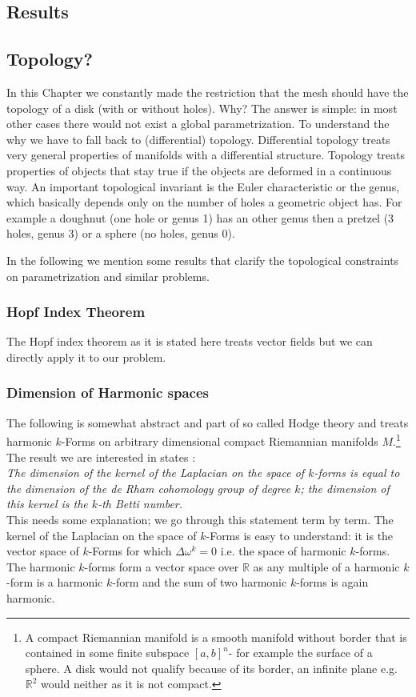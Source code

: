 \subsection{Results}

\subsection{Topology?}
In this Chapter we constantly made the restriction that the mesh should have the topology of a disk (with or without holes). Why? The answer is simple: in most other cases there would not exist a global parametrization. To understand the why we have to fall back to (differential) topology. Differential topology treats very general properties of manifolds with a differential structure. Topology treats properties of objects that stay true if the objects are deformed in a continuous way. An important topological invariant is the Euler characteristic or the genus, which basically depends only on the number of holes a geometric object has. For example a doughnut (one hole or genus 1) has an other genus then a pretzel (3 holes, genus 3) or a sphere (no holes, genus 0).

In the following we mention some results that clarify the topological constraints on parametrization and similar problems.

\subsubsection{Hopf Index Theorem}
The Hopf index theorem  as it is stated here treats vector fields but we can directly apply it to our problem.

\subsubsection{Dimension of Harmonic spaces }
The following is somewhat abstract and part of so called Hodge theory and treats harmonic $k$-Forms on arbitrary dimensional compact Riemannian manifolds $M$.\footnote{ A compact Riemannian manifold is a smooth manifold without border that is contained in some finite subspace $[a,b]^n$- for example the surface of a sphere. A disk would not qualify because of its border, an infinite plane e.g. $\mathbb R^2$ would neither as it is not compact.} The result we are interested in states : 
\[\]
\emph{The dimension of the kernel of the Laplacian on the space of $k$-forms is equal to the dimension of the de Rham cohomology group of degree $k$; the dimension of this kernel is the $k$-th Betti number.} 
\[\]
This needs some explanation; we go through this statement term by term. The kernel of the Laplacian on the space of $k$-Forms is easy to understand: it is the vector space of $k$-Forms for which $\Delta \omega^k = 0$ i.e. the space of harmonic $k$-forms. The harmonic $k$-forms form a vector space over $\mathbb R$ as any multiple of a harmonic $k$-form is a harmonic $k$-form and the sum of two harmonic $k$-forms is again harmonic.

